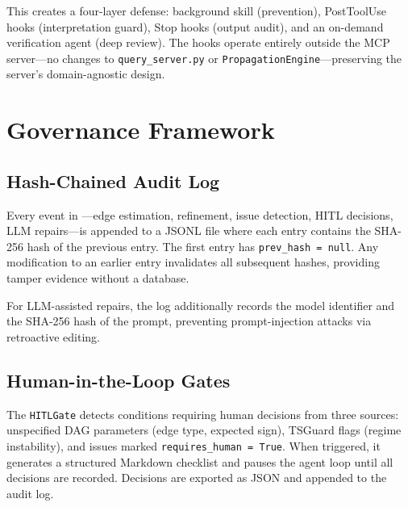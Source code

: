 \documentclass{article}
\begin{document}
This creates a four-layer defense: background skill (prevention), PostToolUse hooks (interpretation guard), Stop hooks (output audit), and an on-demand verification agent (deep review). The hooks operate entirely outside the MCP server---no changes to \texttt{query\_server.py} or \texttt{PropagationEngine}---preserving the server's domain-agnostic design.

\section{Governance Framework}
\label{sec:governance}

\subsection{Hash-Chained Audit Log}

Every event in \oc{}---edge estimation, refinement, issue detection, HITL decisions, LLM repairs---is appended to a JSONL file where each entry contains the SHA-256 hash of the previous entry. The first entry has \texttt{prev\_hash = null}. Any modification to an earlier entry invalidates all subsequent hashes, providing tamper evidence without a database.

For LLM-assisted repairs, the log additionally records the model identifier and the SHA-256 hash of the prompt, preventing prompt-injection attacks via retroactive editing.

\subsection{Human-in-the-Loop Gates}

The \texttt{HITLGate} detects conditions requiring human decisions from three sources: unspecified DAG parameters (\eg edge type, expected sign), TSGuard flags (regime instability), and issues marked \texttt{requires\_human = True}. When triggered, it generates a structured Markdown checklist and pauses the agent loop until all decisions are recorded. Decisions are exported as JSON and appended to the audit log.
\end{document}
